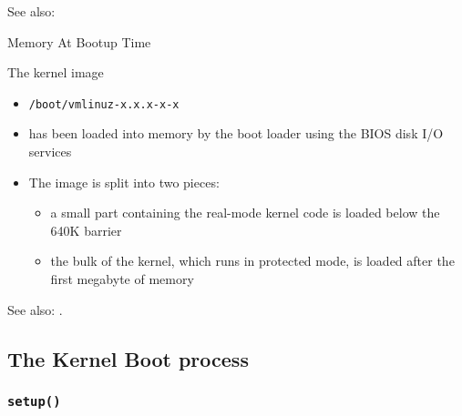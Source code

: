 See also: 

\begin{frame}{Memory At Bootup Time}
  \begin{minipage}{.7\textwidth}
    \begin{block}{The kernel image}
      \begin{itemize}
      \item \texttt{/boot/vmlinuz-x.x.x-x-x}
      \item has been loaded into memory by the boot loader using the BIOS disk I/O
        services
      \item The image is split into two pieces:
        \begin{itemize}
        \item a small part containing the real-mode kernel code is loaded below the 640K
          barrier
        \item the bulk of the kernel, which runs in protected mode, is loaded after the
          first megabyte of memory
        \end{itemize}
      \end{itemize}
    \end{block}
  \end{minipage}\hfill
  \begin{minipage}{.25\textwidth}\label{fig:boot-mem3}
    \begin{center}
    \end{center}
  \end{minipage}
\end{frame}

See also: .

\subsection{The Kernel Boot process}

\subsubsection{\texttt{setup()}}

